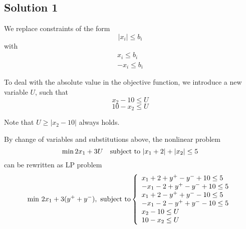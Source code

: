 \documentclass{article}
\begin{document}
\subsection{Solution 1}
We replace constraints of the form
\begin{equation} |x_i| \leq b_i \end{equation}
with
\begin{equation}
\begin{split}
	x_i \leq b_i \\
	-x_i \leq b_i
\end{split}
\end{equation}

To deal with the absolute value in the objective function, we introduce a new variable $U$, such that
\[ x_2 -10 \leq U \]
\[ 10 - x_2 \leq U \]

Note that $U \geq |x_2 -10|$ always holds.


By change of variables and substitutions above, the nonlinear problem
\[ \min 2 x_1 + 3U \quad \textnormal{subject to~} |x_1 + 2| + |x_2| \leq 5 \]
can be rewritten as LP problem
\begin{equation}
\min \, 2x_1+3(y^+ + y^-), \textnormal{ subject to}
\left\{
    \begin{array}{l}
    x_1 + 2 + y^+ - y^- + 10 \leq 5 \\
    -x_1 - 2 + y^+ - y^- + 10 \leq 5 \\
    x_1 + 2 - y^+ + y^- - 10 \leq 5 \\
    -x_1 - 2 - y^+ + y^- - 10 \leq 5 \\
    x_2 -10 \leq U \\
    10 - x_2 \leq U 
    \end{array}
\right.
\end{equation}
\end{document}
